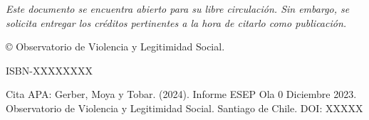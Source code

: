 \null\vfill
\begin{flushleft}
\thispagestyle{empty}
\textit{Este documento se encuentra abierto para su libre circulación. Sin embargo, se solicita entregar los créditos pertinentes a la hora de citarlo como publicación.}

© Observatorio de Violencia y Legitimidad Social. 

ISBN-XXXXXXXX

\noindent Cita APA: Gerber, Moya y Tobar. (2024). Informe ESEP Ola 0 Diciembre 2023.  Observatorio de Violencia y Legitimidad Social. Santiago de Chile. DOI: XXXXX

\end{flushleft}
